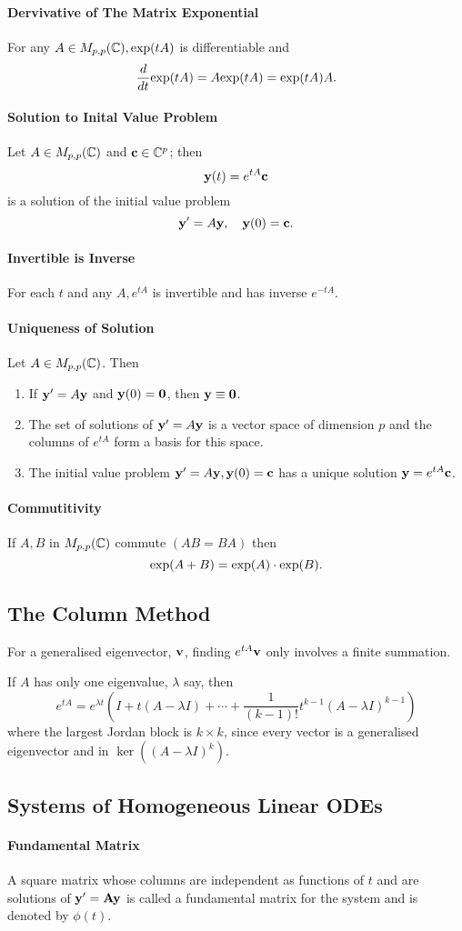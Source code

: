 \paragraph{Dervivative of The Matrix Exponential}
For any \(A \in M_{p,p}(\mathbb{C}), \mathrm{exp}(tA)\) is differentiable and
\[\frac{d}{dt}\mathrm{exp}(tA) = A\mathrm{exp}(tA) = \exp(tA)A.\]

\paragraph{Solution to Inital Value Problem}
Let \(A \in M_{p,p}(\mathbb{C})\) and \(\mathbf{c} \in \mathbb{C}^p\); then
\[\mathbf{y}(t) = e^{tA}\mathbf{c}\]
is a solution of the initial value problem
\[\mathbf{y}' = A\mathbf{y}, \quad \mathbf{y}(0) = \mathbf{c}.\]

\paragraph{Invertible is Inverse}
For each \(t\) and any \(A, e^{tA}\) is invertible and has inverse \(e^{-tA}\).

\paragraph{Uniqueness of Solution}
Let \(A \in M_{p,p}(\mathbb{C})\). Then
\begin{enumerate}
    \item If \(\mathbf{y}' = A\mathbf{y}\) and \(\mathbf{y}(0) = \mathbf{0}\), then \(\mathbf{y} \equiv \mathbf{0}\).
    \item The set of solutions of \(\mathbf{y}' = A\mathbf{y}\) is a vector space of dimension \(p\) and the columns of \(e^{tA}\) form a basis for this space. 
    \item The initial value problem \(\mathbf{y}' = A\mathbf{y}, \mathbf{y}(0) = \mathbf{c}\) has a unique solution \(\mathbf{y} = e^{tA}\mathbf{c}\).
\end{enumerate}

\paragraph{Commutitivity}
If \(A, B\) in \(M_{p,p}(\mathbb{C})\) commute \((AB = BA)\) then
\[\mathrm{exp}(A + B) = \mathrm{exp}(A) \cdot \exp(B).\]

\subsection{The Column Method}
For a generalised eigenvector, \(\mathbf{v}\), finding \(e^{tA}\mathbf{v}\) only involves a finite summation.

If \(A\) has only one eigenvalue, \(\lambda\) say, then
\[e^{tA} = e^{\lambda t}(I + t(A - \lambda I) + \cdots + \frac{1}{(k-1)!}t^{k-1}(A - \lambda I)^{k-1})\]
where the largest Jordan block is \(k \times k\), since every vector is a generalised eigenvector and in \(\ker((A - \lambda I)^k)\).

\subsection{Systems of Homogeneous Linear ODEs}
\paragraph{Fundamental Matrix}
A square matrix whose columns are independent as functions of \(t\) and are solutions of \(\mathbf{y}' = \mathbf{A}\mathbf{y}\) is called a fundamental matrix for the system and is denoted by \(\phi(t)\).